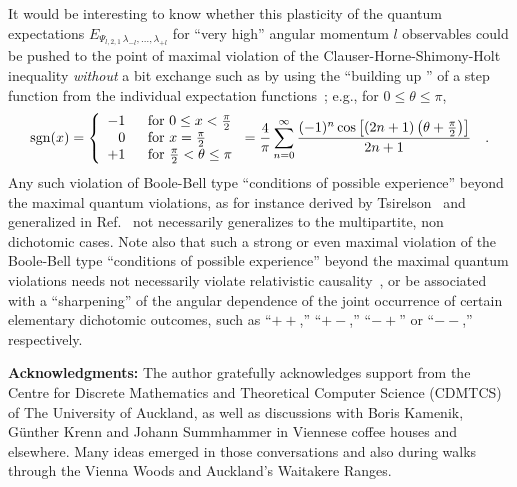 \documentclass[pra,amsfonts,showpacs,showkeys,preprint]{revtex4}
\begin{document}
It would be interesting to know whether this plasticity of the quantum expectations
$E_{{ \Psi_{l,2,1}}\,\lambda_{-l}, \ldots , \lambda_{+l} }$
for ``very high'' angular momentum $l$ observables
could be pushed to the point of maximal violation of
the Clauser-Horne-Shimony-Holt inequality {\em without} a  bit exchange
such as by using the
``building up '' of a step function from the individual expectation functions~\cite{svozil-krenn}; e.g., for  $0 \leq \theta \leq \pi $,
\begin{equation}
{\rm sgn} (x)
=\left\{ \begin{array}{rl}
-1 \; &\text{  for } 0\le x<\frac{\pi}{2} \\
 0 \; &\text{  for }  x=\frac{\pi}{2}  \\
+1 \; &\text{  for }  \frac{\pi}{2} <  \theta \le \pi
   \end{array} \right.
={4\over \pi }\sum_{n=0}^\infty {(-1)^n\cos \left[(2n+1)\left( \theta +\frac{\pi}{2}\right)\right]\over
2n+1}\quad .
\label{e:10}
\end{equation}
Any such violation of Boole-Bell type ``conditions of possible experience'' beyond the maximal quantum
violations, as for instance
derived by Tsirelson~\cite{cirelson} and generalized in Ref.~\cite{filipp-svo-04-qpoly-prl} not necessarily generalizes
to the multipartite, non dichotomic cases.
Note also that such a strong or even maximal violation of the Boole-Bell type ``conditions of possible experience'' beyond the maximal quantum
violations
needs
not necessarily violate relativistic causality~\cite{popescu-97,popescu-97b},
or be associated with a ``sharpening'' of the angular dependence of the joint occurrence of certain elementary dichotomic outcomes,
such as  ``$++$,'' ``$+-$,'' ``$-+$'' or ``$--$,'' respectively.

{\bf Acknowledgments:}
The author gratefully acknowledges support from the Centre for Discrete Mathematics and Theoretical Computer Science (CDMTCS) of
The University of Auckland, as well as discussions with Boris Kamenik, G\"unther Krenn and Johann Summhammer in Viennese coffee houses and elsewhere.
Many ideas emerged in those conversations and also during walks through the Vienna Woods and Auckland's Waitakere Ranges.





\appendix
\end{document}
